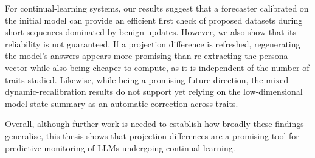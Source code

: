 For continual-learning systems, our results suggest that a forecaster calibrated on the initial model can provide an efficient first check of proposed datasets during short sequences dominated by benign updates. However, we also show that its reliability is not guaranteed. If a projection difference is refreshed, regenerating the model's answers appears more promising than re-extracting the persona vector while also being cheaper to compute, as it is independent of the number of traits studied. Likewise, while being a promising future direction, the mixed dynamic-recalibration results do not support yet relying on the low-dimensional model-state summary as an automatic correction across traits.

Overall, although further work is needed to establish how broadly these findings generalise, this thesis shows that projection differences are a promising tool for predictive monitoring of LLMs undergoing continual learning.
